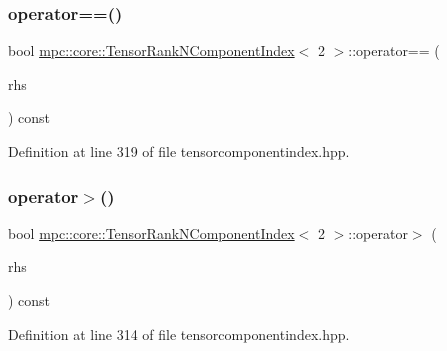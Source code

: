 \subsubsection{\texorpdfstring{operator==()}{operator==()}}
{\footnotesize\ttfamily bool \mbox{\hyperlink{classmpc_1_1core_1_1_tensor_rank_n_component_index}{mpc\+::core\+::\+Tensor\+Rank\+N\+Component\+Index}}$<$ 2 $>$\+::operator== (\begin{DoxyParamCaption}\item[{const \mbox{\hyperlink{classmpc_1_1core_1_1_tensor_rank_n_component_index}{Tensor\+Rank\+N\+Component\+Index}}$<$ 2 $>$ \&}]{rhs }\end{DoxyParamCaption}) const\hspace{0.3cm}{\ttfamily [inline]}}



Definition at line 319 of file tensorcomponentindex.\+hpp.

\mbox{\label{classmpc_1_1core_1_1_tensor_rank_n_component_index_3_012_01_4_a7fd0591ac06ae0ffc5b9fe7050bfe8f0}} 
\subsubsection{\texorpdfstring{operator$>$()}{operator>()}}
{\footnotesize\ttfamily bool \mbox{\hyperlink{classmpc_1_1core_1_1_tensor_rank_n_component_index}{mpc\+::core\+::\+Tensor\+Rank\+N\+Component\+Index}}$<$ 2 $>$\+::operator$>$ (\begin{DoxyParamCaption}\item[{const \mbox{\hyperlink{classmpc_1_1core_1_1_tensor_rank_n_component_index}{Tensor\+Rank\+N\+Component\+Index}}$<$ 2 $>$ \&}]{rhs }\end{DoxyParamCaption}) const\hspace{0.3cm}{\ttfamily [inline]}}



Definition at line 314 of file tensorcomponentindex.\+hpp.

\mbox{\label{classmpc_1_1core_1_1_tensor_rank_n_component_index_3_012_01_4_ac33102ffc7a99fdc67888c9279b294e6}} 
